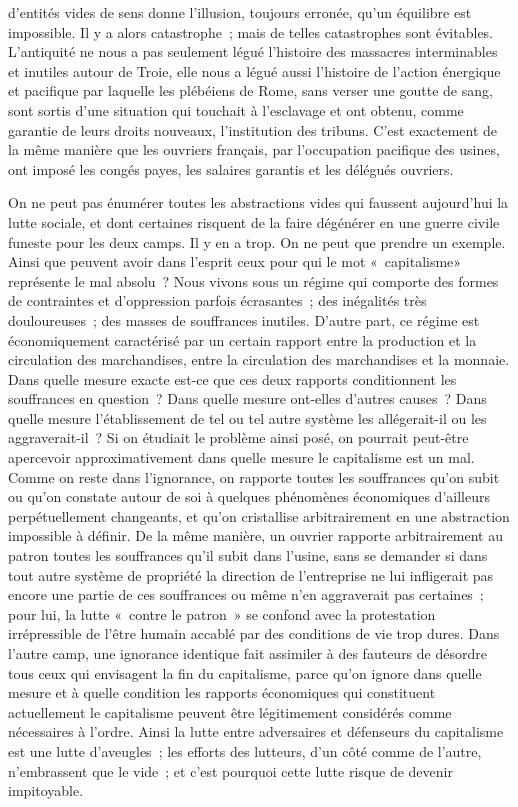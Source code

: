 \documentclass[french,twoside]{book} %
\begin{document}
d'entités vides de sens donne l’illusion, toujours erronée, qu'un équilibre est impossible. Il y a alors catastrophe ; mais de telles catastrophes sont évitables. L'antiquité ne nous a pas seulement légué l'histoire des massacres interminables et inutiles autour de Troie, elle nous a légué aussi l'histoire de l'action énergique et pacifique par laquelle les plébéiens de Rome, sans verser une goutte de sang, sont sortis d'une situation qui touchait à l'esclavage et ont obtenu, comme garantie de leurs droits nouveaux, l'institution des tribuns. C'est exactement de la même manière que les ouvriers français, par l'occupation pacifique des usines, ont imposé les congés payes, les salaires garantis et les délégués ouvriers.\par
On ne peut pas énumérer toutes les abstractions vides qui faussent aujourd'hui la lutte sociale, et dont certaines risquent de la faire dégénérer en une guerre civile funeste pour les deux camps. Il y en a trop. On ne peut que prendre un exemple. Ainsi que peuvent avoir dans l'esprit ceux pour qui le mot « capitalisme» représente le mal absolu ? Nous vivons sous un régime qui comporte des formes de contraintes et d'oppression parfois écrasantes ; des inégalités très douloureuses ; des masses de souffrances inutiles. D'autre part, ce régime est économiquement caractérisé par un certain rapport entre la production et la circulation des marchandises, entre la circulation des marchandises et la monnaie. Dans quelle mesure exacte est-ce que ces deux rapports conditionnent les souffrances en question ? Dans quelle mesure ont-elles d'autres causes ? Dans quelle mesure l'établissement de tel ou tel autre système les allégerait-il ou les aggraverait-il ? Si on étudiait le problème ainsi posé, on pourrait peut-être apercevoir approximativement dans quelle mesure le capitalisme est un mal. Comme on reste dans l'ignorance, on rapporte toutes les souffrances qu'on subit ou qu'on constate autour de soi à quelques phénomènes économiques d'ailleurs perpétuellement changeants, et qu'on cristallise arbitrairement en une abstraction impossible à définir. De la même manière, un ouvrier rapporte arbitrairement au patron toutes les souffrances qu'il subit dans l'usine, sans se demander si dans tout autre système de propriété la direction de l'entreprise ne lui infligerait pas encore une partie de ces souffrances ou même n'en aggraverait pas certaines ; pour lui, la lutte « contre le patron » se confond avec la protestation irrépressible de l'être humain accablé par des conditions de vie trop dures. Dans l'autre camp, une ignorance identique fait assimiler à des fauteurs de désordre tous ceux qui envisagent la fin du capitalisme, parce qu'on ignore dans quelle mesure et à quelle condition les rapports économiques qui constituent actuellement le capitalisme peuvent être légitimement considérés comme nécessaires à l'ordre. Ainsi la lutte entre adversaires et défenseurs du capitalisme est une lutte d'aveugles ; les efforts des lutteurs, d'un côté comme de l'autre, n'embrassent que le vide ; et c'est pourquoi cette lutte risque de devenir impitoyable.\par
\end{document}
